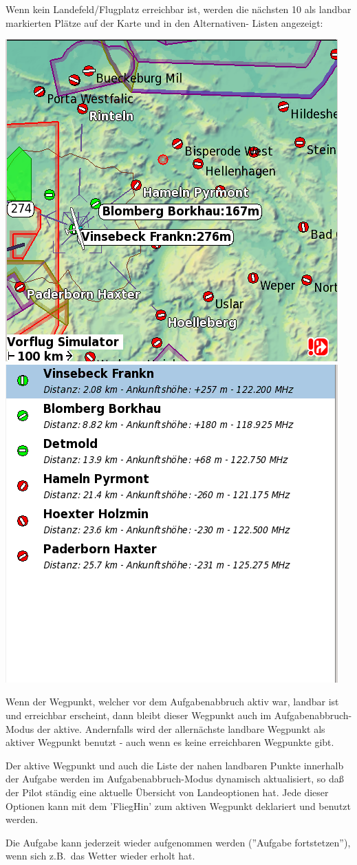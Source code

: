 Wenn kein Landefeld/Flugplatz erreichbar ist, werden die nächsten 10 als landbar markierten Plätze auf der Karte und in den Alternativen- Listen angezeigt:

\begin{center}
\includegraphics[angle=0,width=0.45\linewidth,keepaspectratio='true']{figures/abort-low.png}
\quad
\includegraphics[angle=0,width=0.45\linewidth,keepaspectratio='true']{figures/abort-high.png}
\end{center}

Wenn der Wegpunkt, welcher vor dem Aufgabenabbruch aktiv war, landbar ist und erreichbar erscheint,
dann bleibt dieser Wegpunkt auch im Aufgabenabbruch-Modus der aktive.
Andernfalls wird der allernächste landbare  Wegpunkt als aktiver Wegpunkt benutzt - auch wenn es
keine erreichbaren Wegpunkte gibt.

Der aktive  Wegpunkt und auch die Liste der nahen landbaren Punkte innerhalb der Aufgabe werden im Aufgabenabbruch-Modus dynamisch aktualisiert, so daß der Pilot ständig eine aktuelle Übersicht von Landeoptionen hat.  Jede dieser Optionen kann  mit dem 'FliegHin' zum aktiven Wegpunkt deklariert und benutzt werden.

Die Aufgabe kann jederzeit wieder aufgenommen werden (''Aufgabe fortstetzen''), wenn sich z.B.\ das Wetter wieder erholt hat.

